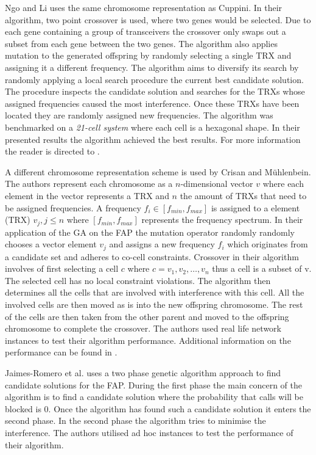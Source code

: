 Ngo and Li\cite{GANgoLi} uses the same chromosome representation as Cuppini\cite{GACuppini}. In their algorithm, two point crossover is used, where two genes would be selected. Due to each gene containing a group of transceivers the crossover only swaps out a subset from each gene between the two genes. The algorithm also applies mutation to the generated offspring by randomly selecting a single TRX and assigning it a different frequency. The algorithm aims to diversify its search by randomly applying a local search procedure the current best candidate solution. The procedure inspects the candidate solution and searches for the TRXs whose assigned frequencies caused the most interference. Once these TRXs have been located they are randomly assigned new frequencies. The algorithm was benchmarked on a \emph{21-cell system} where each cell is a hexagonal shape. In their presented results the algorithm achieved the best results. For more information the reader is directed to \cite{GANgoLi}.

A different chromosome representation scheme is used by Crisan and M\"uhlenbein\cite{GACrisan}. The authors represent each chromosome as a $n$-dimensional vector $v$ where each element in the vector represents a TRX and $n$ the amount of TRXs that need to be assigned frequencies. A frequency $f_i \in [f_{min}, f_{max}]$ is assigned to a element (TRX) $v_j, j \le n$ where $[f_{min}, f_{max}]$ represents the frequency spectrum. In their application of the \gls{GA} on the FAP the mutation operator randomly randomly chooses a vector element $v_j$ and assigns a new frequency $f_i$ which originates from a candidate set and adheres to co-cell constraints. Crossover in their algorithm involves of first selecting a cell $c$ where $c = {v_1,v_2,\dots,v_n}$ thus a cell is a subset of v. The selected cell has no local constraint violations. The algorithm then determines all the cells that are involved with interference with this cell. All the involved cells are then moved as is into the new offspring chromosome. The rest of the cells are then taken from the other parent and moved to the offspring chromosome to complete the crossover. The authors used real life network instances to test their algorithm performance. Additional information on the performance can be found in \cite{GACrisan}.

Jaimes-Romero et al.\cite{GAJaimes} uses a two phase genetic algorithm approach to find candidate solutions for the \gls{FAP}. During the first phase the main concern of the algorithm is to find a candidate solution where the probability that calls will be blocked is 0. Once the algorithm has found such a candidate solution it enters the second phase. In the second phase the algorithm tries to minimise the interference. The authors utilised ad hoc instances to test the performance of their algorithm.

